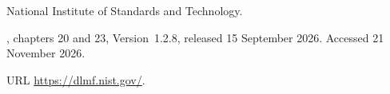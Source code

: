 {National Institute of Standards and Technology}.

, chapters 20 and 23,
  Version~1.2.8, released 15 September 2026. Accessed 21 November 2026.

\newblock URL \url{https://dlmf.nist.gov/}.
